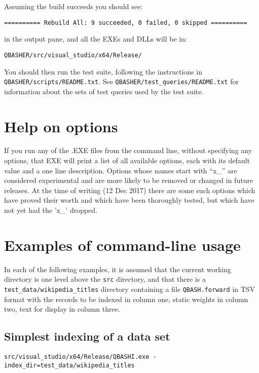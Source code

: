 \documentclass{article}
\begin{document}
\noindent Assuming the build succeeds you should see:

\begin{verbatim}
========== Rebuild All: 9 succeeded, 0 failed, 0 skipped ==========
\end{verbatim}

\noindent in the output pane, and all the EXEs and DLLs will be in:

\begin{verbatim}
QBASHER/src/visual_studio/x64/Release/
\end{verbatim}

You should then run the test suite, following the instructions in
\texttt{QBASHER/scripts/README.txt}. See
\texttt{QBASHER/test\_queries/README.txt} for information about the
sets of test queries used by the test suite.

\section{Help on options}
If you run any of the .EXE files from the command line, without
specifying any options, that EXE will print a list of all available
options, each with its default value and a one line description.
Options whose names start with ``x\_'' are considered experimental and
are more likely to be removed or changed in future releases.    At the
time of writing (12 Dec 2017) there are some such options which have
proved their worth and which have been thoroughly tested, but which
have not yet had the 'x\_' dropped.


\section{Examples of command-line usage}

In each of the following examples, it is assumed that the current
working directory is one level above the \texttt{src} directory, and
that there is a \texttt{test\_data/wikipedia\_titles} directory containing a file
\texttt{QBASH.forward} in TSV format with the records to be
indexed in column one, static weights in column two, text for display
in column three.


\subsection{Simplest indexing of a data set}

{\footnotesize
\begin{verbatim}
src/visual_studio/x64/Release/QBASHI.exe -index_dir=test_data/wikipedia_titles
\end{verbatim}
}
\end{document}
